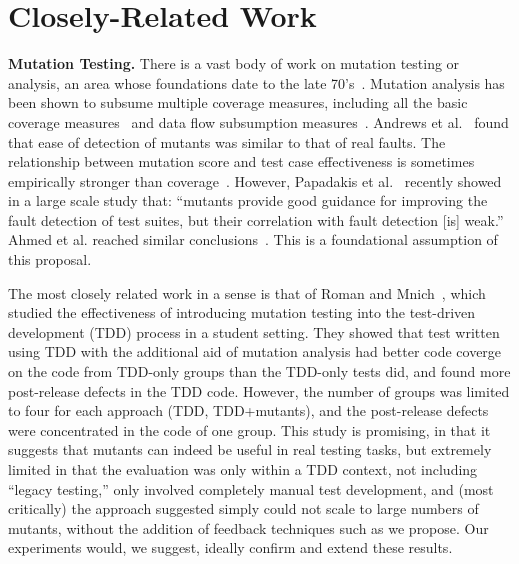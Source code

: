 \section{Closely-Related Work}

\noindent\textbf{Mutation Testing.}
%
There is a vast body of work on mutation testing or analysis, an area whose foundations date
to the late 70's~\cite{demillo1978hints,budd1980theoretical}.  
%
Mutation analysis has been shown to subsume multiple coverage measures,
including all the basic coverage
measures~\cite{myer1979art,offutt1996subsumption} and data flow
subsumption measures~\cite{mathur1994empirical}.  
Andrews et al.~\cite{andrews2005mutation,andrews2006using} found that ease of detection
of mutants was similar to that of real faults.
The relationship between
mutation score and test case effectiveness is sometimes empirically stronger
than 
coverage~\cite{just2014mutants}. However, Papadakis et
al.~\cite{papadakis2018mutation} recently 
showed in a large scale study that: ``mutants provide good guidance for improving the
fault detection of test suites, but their correlation with fault
detection [is] weak.''  Ahmed et al. reached similar
conclusions~\cite{ahmed_testedness}.  This is a foundational assumption of this proposal.  

The most closely related work in a sense is that of Roman and
Mnich~\cite{tddmut}, which studied the effectiveness of introducing
mutation testing into the test-driven development (TDD) process in a
student setting.  They showed that test written using TDD with the
additional aid of mutation analysis had better code coverge on the
code from TDD-only groups than the TDD-only tests did, and found more
post-release defects in the TDD code.  However, the number of groups
was limited to four for each approach (TDD, TDD+mutants), and the
post-release defects were concentrated in the code of one group.  This
study is promising, in that it suggests that mutants can indeed be
useful in real testing tasks, but extremely limited in that the
evaluation was only within a TDD context, not including ``legacy
testing,'' only involved completely manual test development, and (most
critically) the approach suggested simply could not scale to large
numbers of mutants, without the addition of feedback techniques such
as we propose.  Our experiments would, we suggest, ideally confirm and
extend these results.

